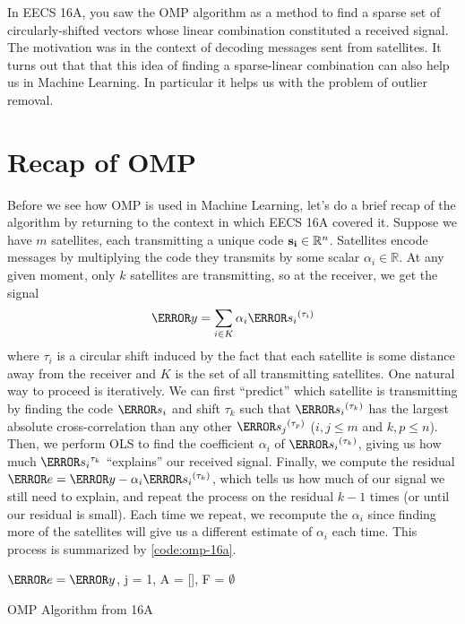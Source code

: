 

\renewcommand{\documentnumber}{x}


  \thispagestyle{fancy}
  \newpage

  In EECS 16A, you saw the OMP algorithm as a method to find a sparse set of circularly-shifted vectors whose linear combination constituted a received signal.
  The motivation was in the context of decoding messages sent from satellites. It turns out that that this idea of finding a sparse-linear combination can also help us in Machine Learning. In particular it helps us with the problem of outlier removal.
  \section{Recap of OMP}
  Before we see how OMP is used in Machine Learning, let's do a brief recap of the algorithm by returning to the context in which EECS 16A covered it. 
  Suppose we have $m$ satellites, each transmitting a unique code $\mathbf{s_i}\in\mathbb{R}^n$. 
  Satellites encode messages by multiplying the code they transmits by some scalar $\alpha_i\in\mathbb{R}$.
  At any given moment, only $k$ satellites are transmitting, so at the receiver, we get the signal
  \[
	\V{y} = \sum_{i\in K} \alpha_i\V{s_i}^{(\tau_i)}
  \]
  where $\tau_i$ is a circular shift induced by the fact that each satellite is some distance away from the receiver and $K$ is the set of all transmitting satellites.
  One natural way to proceed is iteratively. We can first ``predict'' which satellite is transmitting by finding the code $\V{s_i}$ and shift $\tau_k$ such that $\V{s_i}^{(\tau_k)}$ has the largest absolute cross-correlation than any other $\V{s_j}^{(\tau_p)}$ ($i, j \leq m$ and $k, p \leq n$).
  Then, we perform OLS to find the coefficient $\alpha_i$ of $\V{s_i}^{(\tau_k)}$, giving us how much $\V{s_i}^{\tau_k}$ ``explains'' our received signal.
  Finally, we compute the residual $\V{e} = \V{y} - \alpha_i\V{s_i}^{(\tau_k)}$, which tells us how much of our signal we still need to explain, and repeat the process on the residual $k-1$ times (or until our residual is small).
  Each time we repeat, we recompute the $\alpha_i$ since finding more of the satellites will give us a different estimate of $\alpha_i$ each time.
  This process is summarized by \cref{code:omp-16a}.
  \begin{algorithm}[!h]
	\SetAlgoLined
	$\V{e} = \V{y}$, j = 1, A = [], F = $\emptyset$\;
	\caption{OMP Algorithm from 16A}
	\label{code:omp-16a}
  \end{algorithm}
